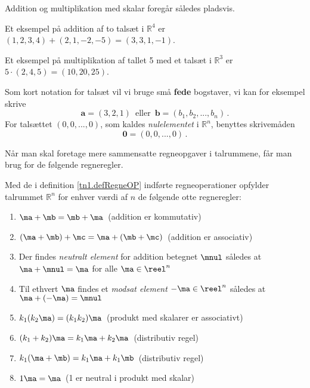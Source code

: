 Addition og multiplikation med skalar foregår således pladsvis.

\begin{example}
Et eksempel på addition af to talsæt i  $\mathbb R ^4$ er
$(1,2,3,4)+(2,1,-2,-5)=(3,3,1,-1)$.
\end{example}
\begin{example}
Et eksempel på multiplikation af tallet 5 med et talsæt i  $\mathbb R ^3$ er
$5\cdot(2,4,5)=(10,20,25)$.
\end{example}

Som kort notation for talsæt vil vi bruge små \textbf{fede} bogstaver, vi kan for eksempel skrive 
$$\mathbf{a}=(3,2,1)\,\,\,\mathrm{eller}\,\,\,\mathbf{b}=(b_1,b_2,...,b_n)\,.$$
For talsættet $(0,0,...,0)$, som kaldes \emph{nulelementet} i $\mathbb R ^n$, benyttes skrivemåden $$\mathbf{0}=(0,0,...,0)\,.$$

Når man skal foretage mere sammensatte regneopgaver i talrummene, får man brug for de følgende regneregler.

\begin{theorem}
Med de i definition \ref{tn1.defRegneOP} indførte regneoperationer opfylder talrummet $\mathbb R ^n$ for enhver værdi af $n$ de følgende otte regneregler:
\begin{enumerate}
\item
$ \ma + \mb = \mb + \ma $ \,(addition er kommutativ) 
\item
$ (\ma + \mb) + \mc = \ma + (\mb + \mc) $ \,(addition er associativ) 
\item
Der findes \textit{neutralt element} for addition betegnet $\mnul$ således at $\ma + \mnul = \ma $ for alle $\ma \in \reel^n$ 
\item
Til ethvert $\ma$ findes et \textit{modsat element} $-\ma \in \reel^n$ således at $ \ma + (-\ma) = \mnul $ 
\item
$ k_1(k_2\ma) = (k_1k_2)\ma $ \,(produkt med skalarer er associativt) 
\item
$ (k_1 + k_2)\ma = k_1\ma + k_2\ma $ \,(distributiv regel) 
\item
$ k_1(\ma+\mb) = k_1\ma + k_1\mb $ \,(distributiv regel)  
\item
$ 1\ma = \ma $ \,(1 er neutral i produkt med skalar) 
\end{enumerate}
\end{theorem}

